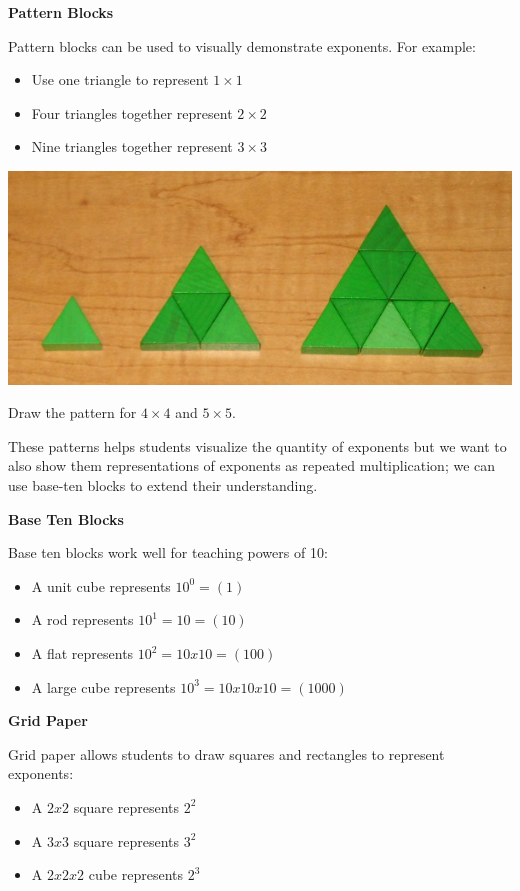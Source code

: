 \documentclass[
  letterpaper,
  DIV=11,
  numbers=noendperiod]{scrartcl}
\providecommand{\tightlist}{%
  \setlength{\itemsep}{0pt}\setlength{\parskip}{0pt}}\usepackage{longtable,booktabs,array}
\begin{document}
\textbf{Pattern Blocks}

Pattern blocks can be used to visually demonstrate exponents. For
example:

\begin{itemize}
\tightlist
\item
  Use one triangle to represent \(1 \times 1\)
\item
  Four triangles together represent \(2 \times 2\)
\item
  Nine triangles together represent \(3 \times 3\)
\end{itemize}

\includegraphics{../img/mod03/pattern-blocks.jpg}

Draw the pattern for \(4 \times 4\) and \(5 \times 5\).

These patterns helps students visualize the quantity of exponents but we
want to also show them representations of exponents as repeated
multiplication; we can use base-ten blocks to extend their
understanding.

\textbf{Base Ten Blocks}

Base ten blocks work well for teaching powers of 10:

\begin{itemize}
\tightlist
\item
  A unit cube represents \(10^0 = (1)\)
\item
  A rod represents \(10^1 = 10 = (10)\)
\item
  A flat represents \(10^2 = 10 x 10 = (100)\)
\item
  A large cube represents \(10^3 = 10 x 10 x 10 = (1000)\)
\end{itemize}

\textbf{Grid Paper}

Grid paper allows students to draw squares and rectangles to represent
exponents:

\begin{itemize}
\tightlist
\item
  A \(2 x 2\) square represents \(2^2\)
\item
  A \(3 x 3\) square represents \(3^2\)
\item
  A \(2 x 2 x 2\) cube represents \(2^3\)
\end{itemize}
\end{document}
